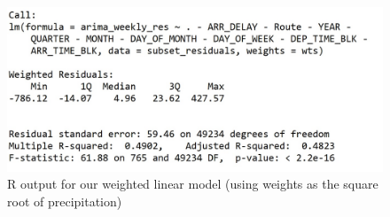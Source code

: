 \documentclass[12pt, a4paper, openany]{book}
\begin{document}
			\begin{figure}[h]
			\centering
	 		\includegraphics[width = .8 \textwidth]{../figures/weighted_lm_output}
	 		\caption{R output for our weighted linear model (using weights as the square root of precipitation)}
	 		\end{figure}



\pagebreak


\nocite{*}

\end{document}

